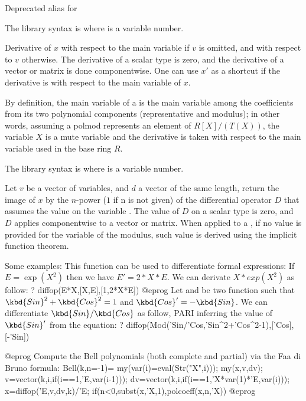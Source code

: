 \label{se:bezoutres}
Deprecated alias for 

The library syntax is  where  is a variable number.

\label{se:deriv}
Derivative of $x$ with respect to the main
variable if $v$ is omitted, and with respect to $v$ otherwise. The derivative
of a scalar type is zero, and the derivative of a vector or matrix is done
componentwise. One can use $x'$ as a shortcut if the derivative is with
respect to the main variable of $x$.

By definition, the main variable of a  is the main variable among
the coefficients from its two polynomial components (representative and
modulus); in other words, assuming a polmod represents an element of
$R[X]/(T(X))$, the variable $X$ is a mute variable and the derivative is
taken with respect to the main variable used in the base ring $R$.

The library syntax is  where  is a variable number.

\label{se:diffop}
Let $v$ be a vector of variables, and $d$ a vector of the same length,
return the image of $x$ by the $n$-power ($1$ if n is not given) of the differential
operator $D$ that assumes the value  on the variable .
The value of $D$ on a scalar type is zero, and $D$ applies componentwise to a vector
or matrix. When applied to a , if no value is provided for the variable
of the modulus, such value is derived using the implicit function theorem.

Some examples:
This function can be used to differentiate formal expressions:
If $E=\exp(X^2)$ then we have $E'=2*X*E$. We can derivate $X*exp(X^2)$ as follow:
\bprog
? diffop(E*X,[X,E],[1,2*X*E])
@eprog
Let  and  be two function such that $\kbd{Sin}^2+\kbd{Cos}^2=1$
and $\kbd{Cos}'=-\kbd{Sin}$. We can differentiate $\kbd{Sin}/\kbd{Cos}$ as follow,
PARI inferring the value of $\kbd{Sin}'$ from the equation:
\bprog
? diffop(Mod('Sin/'Cos,'Sin^2+'Cos^2-1),['Cos],[-'Sin])

@eprog
Compute the Bell polynomials (both complete and partial) via the Faa di Bruno formula:
\bprog
Bell(k,n=-1)=
{
  my(var(i)=eval(Str("X",i)));
  my(x,v,dv);
  v=vector(k,i,if(i==1,'E,var(i-1)));
  dv=vector(k,i,if(i==1,'X*var(1)*'E,var(i)));
  x=diffop('E,v,dv,k)/'E;
  if(n<0,subst(x,'X,1),polcoeff(x,n,'X))
}
@eprog

